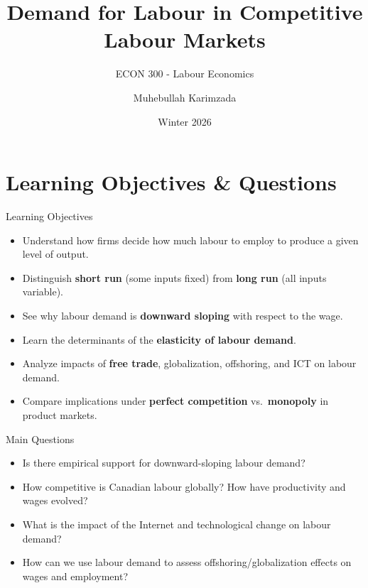 \documentclass[aspectratio=169]{beamer}
\title{\textbf{Demand for Labour in Competitive Labour Markets \vspace{.5cm}\\  }}
\subtitle{ {\large ECON 300 - Labour Economics}}
\author{Muhebullah Karimzada}
\date{Winter 2026}
\begin{document}
\begin{frame}[plain]
  \titlepage
 
\end{frame}

\section{Learning Objectives \& Questions}

\begin{frame}{Learning Objectives}
\transfade
\begin{itemize}
  \item Understand how firms decide how much labour to employ to produce a given level of output.
  \item Distinguish \textbf{short run} (some inputs fixed) from \textbf{long run} (all inputs variable).
  \item See why labour demand is \textbf{downward sloping} with respect to the wage.
    \item Learn the determinants of the \textbf{elasticity of labour demand}.
  \item Analyze impacts of \textbf{free trade}, globalization, offshoring, and ICT on labour demand.
  \item Compare implications under \textbf{perfect competition} vs.\ \textbf{monopoly} in product markets.
\end{itemize}
\end{frame}


\begin{frame}{Main Questions}
\transfade
\begin{itemize}
  \item Is there empirical support for downward-sloping labour demand?
  \item How competitive is Canadian labour globally? How have productivity and wages evolved?
  \item What is the impact of the Internet and technological change on labour demand?
  \item How can we use labour demand to assess offshoring/globalization effects on wages and employment?
\end{itemize}
\end{frame}
\end{document}
